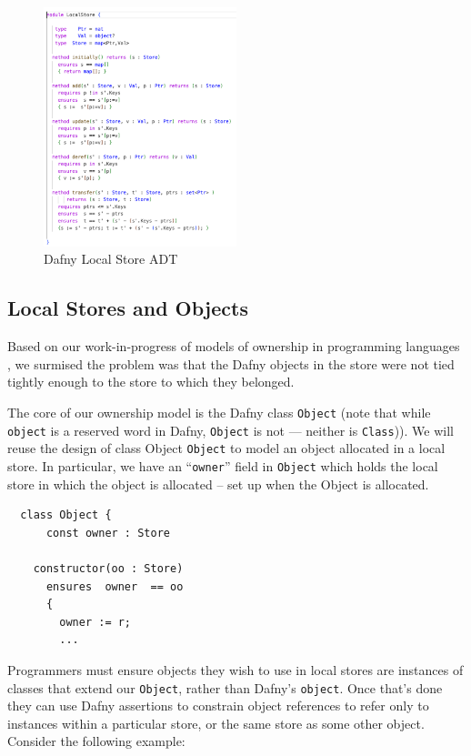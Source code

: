 \begin{figure}[htb]
\centering
\includegraphics[width=0.5\textwidth]{LocalStoreDafny.pdf}
\caption{Dafny Local Store ADT}
\label{fig2}
\end{figure}




\subsection{Local Stores and Objects}

Based on our work-in-progress of models of ownership in
programming languages \cite{dafnydala-ftfjp2024}, we surmised the
problem was that the Dafny objects in the store were not tied tightly
enough to the store to which they belonged. 

The core of our ownership model is the Dafny class \lstinline+Object+
(note that while \lstinline+object+ is a reserved word in Dafny,
\lstinline+Object+ is not --- neither is \lstinline+Class+)). We will
reuse the design of class Object \lstinline+Object+ to model an object
allocated in a local store. In particular, we have an
``\lstinline+owner+'' field in \lstinline+Object+ which holds the
local store in which the object is allocated -- set up when the Object
is allocated.

\begin{lstlisting}
  class Object {  
      const owner : Store
 
    constructor(oo : Store) 
      ensures  owner  == oo
      { 
        owner := r; 
        ...
\end{lstlisting}

Programmers must ensure objects they wish to use in local stores
are instances of classes that extend our \lstinline+Object+,
rather than Dafny's \lstinline+object+. Once that's done
they can use Dafny assertions to constrain object references
to refer only to instances within a particular store, or the same
store as some other object.  Consider the following example:

